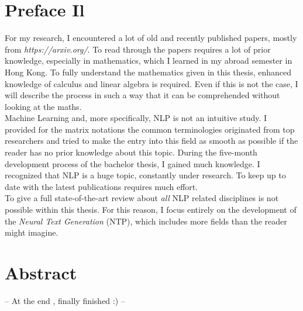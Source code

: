 \section*{Preface Il}
\label{sec:prolog_2}
For my research, I encountered a lot of old and recently published papers, mostly from \textit{https://arxiv.org/}. 
To read through the papers requires a lot of prior knowledge, especially in mathematics, which I learned in my abroad semester in Hong Kong. 
To fully understand the mathematics given in this thesis, enhanced knowledge of calculus and linear algebra is required. Even if this is not the case, I will describe the process in such a way that it can be comprehended without looking at the maths. \\
Machine Learning and, more specifically, NLP is not an intuitive study. I provided for the matrix notations the common terminologies originated from top researchers and tried to make the entry into this field as smooth as possible if the reader has no prior knowledge about this topic.
During the five-month development process of the bachelor thesis, I gained much knowledge. I recognized that NLP is a huge topic, constantly under research. To keep up to date with the latest publications requires much effort. \\
To give a full state-of-the-art review about \textit{all} NLP related disciplines is not possible within this thesis. For this reason, I focus entirely on the development of the \textit{Neural Text Generation} (NTP), which includes more fields than the reader might imagine.




\section*{Abstract}
\label{sec:abstract}

-- At the end , finally finished :) --